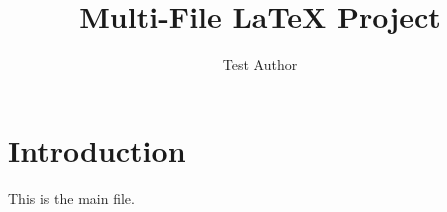 \documentclass{article}
\begin{document}
\title{Multi-File LaTeX Project}
\author{Test Author}
\maketitle

\section{Introduction}

This is the main file.






\end{document}
